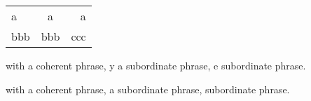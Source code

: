 
    \begin{tabular}{lcr}  
    a&a&a\\ 
    bbb&bbb&ccc 
    \end{tabular} 

\begin{versobranco}
with a coherent    phrase,
y a subordinate\hspace{3cm} phrase,
e subordinate phrase.

with a coherent phrase,
a subordinate phrase,
subordinate phrase.
\end{versobranco}
